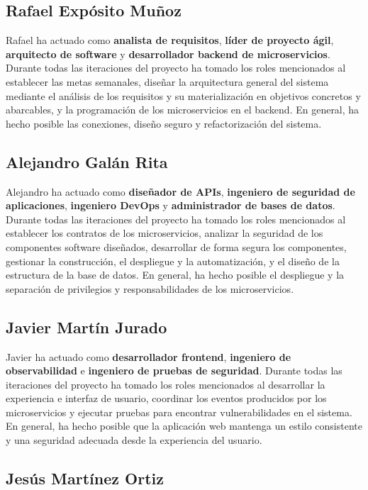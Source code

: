 \documentclass[11pt]{article}
\begin{document}
\subsection{Rafael Expósito Muñoz}

Rafael ha actuado como \textbf{analista de requisitos}, \textbf{líder de proyecto ágil}, \textbf{arquitecto de software} y \textbf{desarrollador backend de microservicios}. Durante todas las iteraciones del proyecto ha tomado los roles mencionados al establecer las metas semanales, diseñar la arquitectura general del sistema mediante el análisis de los requisitos y su materialización en objetivos concretos y abarcables, y la programación de los microservicios en el backend. En general, ha hecho posible las conexiones, diseño seguro y refactorización del sistema.

\subsection{Alejandro Galán Rita}

Alejandro ha actuado como \textbf{diseñador de APIs}, \textbf{ingeniero de seguridad de aplicaciones}, \textbf{ingeniero DevOps} y \textbf{administrador de bases de datos}. Durante todas las iteraciones del proyecto ha tomado los roles mencionados al establecer los contratos de los microservicios, analizar la seguridad de los componentes software diseñados, desarrollar de forma segura los componentes, gestionar la construcción, el despliegue y la automatización, y el diseño de la estructura de la base de datos. En general, ha hecho posible el despliegue y la separación de privilegios y responsabilidades de los microservicios.

\subsection{Javier Martín Jurado}

Javier ha actuado como \textbf{desarrollador frontend}, \textbf{ingeniero de observabilidad} e \textbf{ingeniero de pruebas de seguridad}. Durante todas las iteraciones del proyecto ha tomado los roles mencionados al desarrollar la experiencia e interfaz de usuario, coordinar los eventos producidos por los microservicios y ejecutar pruebas para encontrar vulnerabilidades en el sistema. En general, ha hecho posible que la aplicación web mantenga un estilo consistente y una seguridad adecuada desde la experiencia del usuario.

\subsection{Jesús Martínez Ortiz}
\end{document}
